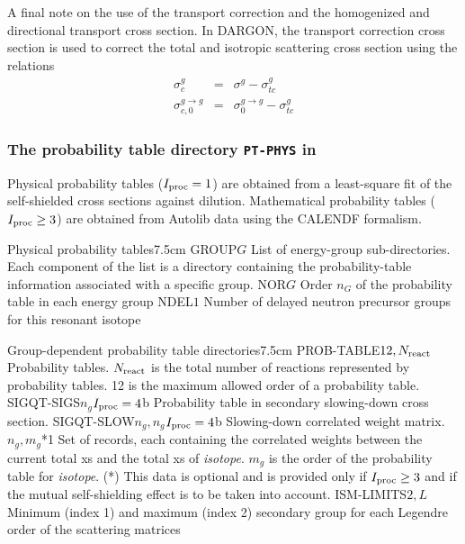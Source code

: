 \vskip 0.15cm

A final note on the use of the transport correction and the homogenized and
directional transport cross section. In DARGON, the transport correction cross
section is used to correct the total and isotropic scattering cross
section using the relations
\begin{eqnarray*}
\sigma_{c}^{g}       &=& \sigma^{g}         -\sigma_{tc}^{g}\\
\sigma_{c,0}^{g\to g}&=& \sigma_{0}^{g\to g}-\sigma_{tc}^{g}
\end{eqnarray*}

\goodbreak

\subsubsection{The probability table directory {\tt PT-PHYS} in
}\label{sect:phys}

Physical probability tables ($I_{\rm proc}=1$) are obtained from a least-square fit of the
self-shielded cross sections against dilution. Mathematical probability tables ($I_{\rm proc}\ge 3$) are obtained from
Autolib data using the CALENDF formalism.

\begin{DescriptionEnregistrement}{Physical probability tables}{7.5cm}
\DirlEnr
  {GROUP}{$G$}
  {List of energy-group sub-directories. Each component of the list is a directory containing
  the probability-table information associated with a specific group.}
\IntEnr
  {NOR}{$G$}
  {Order $n_G$ of the probability table in each energy group}
\IntEnr
  {NDEL}{$1$}
  {Number of delayed neutron precursor groups for this resonant isotope}
\end{DescriptionEnregistrement}

\vskip -0.3cm

\begin{DescriptionEnregistrement}{Group-dependent probability table directories}{7.5cm}
\RealEnr
  {PROB-TABLE}{$12,N_{\rm react}$}{}
  {Probability tables. $N_{\rm react}$ is the total number of reactions
   represented by probability tables. 12 is the maximum allowed order of a
   probability table.}
\OptRealEnr
  {SIGQT-SIGS}{$n_g$}{$I_{\rm proc}=4$}{b}
  {Probability table in secondary slowing-down cross section.}
\OptRealEnr
  {SIGQT-SLOW}{$n_g,n_g$}{$I_{\rm proc}=4$}{b}
  {Slowing-down correlated weight matrix.}
\OptRealVar
  {}{$n_g,m_g$}{*}{1}
  {Set of records, each containing the correlated weights
  between the current total xs and the total xs of {\sl isotope}.  $m_g$ is the
  order of the probability table for {\sl isotope}. (*) This data is optional
  and is provided only if $I_{\rm proc}\ge 3$ and if the mutual self-shielding
  effect is to be taken into account.}
\IntEnr
  {ISM-LIMITS}{$2,L$}
  {Minimum (index 1) and maximum (index 2) secondary group for each Legendre
   order of the scattering matrices}
\end{DescriptionEnregistrement}

\eject
